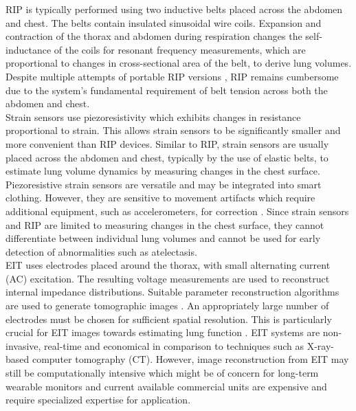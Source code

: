 \documentclass[journal,twoside,web]{ieeecolor}
\begin{document}
RIP is typically performed using two inductive belts placed across the abdomen and chest. The belts contain insulated sinusoidal wire coils. Expansion and contraction of the thorax and abdomen during respiration changes the self-inductance of the coils for resonant frequency measurements, which are proportional to changes in cross-sectional area of the belt, to derive lung volumes. Despite multiple attempts of portable RIP versions \cite{LifeShirtAdvancedSystem}, RIP remains cumbersome due to the system's fundamental requirement of belt tension across both the abdomen and chest. \\ 
Strain sensors use piezoresistivity which exhibits changes in resistance proportional to strain. This allows strain sensors to be significantly smaller and more convenient than RIP devices. Similar to RIP, strain sensors are usually placed across the abdomen and chest, typically by the use of elastic belts, to estimate lung volume dynamics by measuring changes in the chest surface. Piezoresistive strain sensors are versatile and may be integrated into smart clothing. However, they are sensitive to movement artifacts which require additional equipment, such as accelerometers, for correction \cite{defazioOverviewWearablePiezoresistive2021}. Since strain sensors and RIP are limited to measuring changes in the chest surface, they cannot differentiate between individual lung volumes and cannot be used for early detection of abnormalities such as atelectasis. \\
EIT uses electrodes placed around the thorax, with small alternating current (AC) excitation. The resulting voltage measurements are used to reconstruct internal impedance distributions. Suitable parameter reconstruction algorithms are used to generate tomographic images \cite{mansouriElectricalImpedanceTomography2021}. An appropriately large number of electrodes must be chosen for sufficient spatial resolution. This is particularly crucial for EIT images towards estimating lung function \cite{pennatiElectricalImpedanceTomography2023}. EIT systems are non-invasive, real-time and economical in comparison to techniques such as X-ray-based computer tomography (CT). However, image reconstruction from EIT may still be computationally intensive which might be of concern for long-term wearable monitors \cite{boyleAddressingComputationalCost2012} and current available commercial units are expensive and require specialized expertise for application. \\
\end{document}

